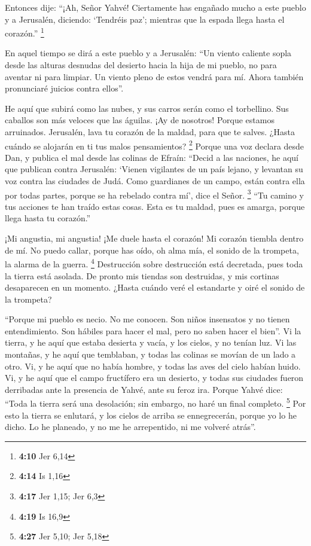 \begin{paracol}{2}
 Entonces dije: ``¡Ah, Señor Yahvé! Ciertamente has
engañado mucho a este pueblo y a Jerusalén, diciendo: `Tendréis paz';
mientras que la espada llega hasta el corazón.'' \footnote{\textbf{4:10}
  Jer 6,14}

 En aquel tiempo se dirá a este pueblo y a Jerusalén:
``Un viento caliente sopla desde las alturas desnudas del desierto hacia
la hija de mi pueblo, no para aventar ni para limpiar. 
Un viento pleno de estos vendrá para mí. Ahora también pronunciaré
juicios contra ellos''.

 He aquí que subirá como las nubes, y sus carros serán
como el torbellino. Sus caballos son más veloces que las águilas. ¡Ay de
nosotros! Porque estamos arruinados.  Jerusalén, lava tu
corazón de la maldad, para que te salves. ¿Hasta cuándo se alojarán en
ti tus malos pensamientos? \footnote{\textbf{4:14} Is 1,16}
 Porque una voz declara desde Dan, y publica el mal desde
las colinas de Efraín:  ``Decid a las naciones, he aquí
que publican contra Jerusalén: `Vienen vigilantes de un país lejano, y
levantan su voz contra las ciudades de Judá.  Como
guardianes de un campo, están contra ella por todas partes, porque se ha
rebelado contra mí', dice el Señor. \footnote{\textbf{4:17} Jer 1,15;
  Jer 6,3}  ``Tu camino y tus acciones te han traído
estas cosas. Esta es tu maldad, pues es amarga, porque llega hasta tu
corazón.''

 ¡Mi angustia, mi angustia! ¡Me duele hasta el corazón!
Mi corazón tiembla dentro de mí. No puedo callar, porque has oído, oh
alma mía, el sonido de la trompeta, la alarma de la guerra. \footnote{\textbf{4:19}
  Is 16,9}  Destrucción sobre destrucción está decretada,
pues toda la tierra está asolada. De pronto mis tiendas son destruidas,
y mis cortinas desaparecen en un momento.  ¿Hasta cuándo
veré el estandarte y oiré el sonido de la trompeta?

 ``Porque mi pueblo es necio. No me conocen. Son niños
insensatos y no tienen entendimiento. Son hábiles para hacer el mal,
pero no saben hacer el bien''.  Vi la tierra, y he aquí
que estaba desierta y vacía, y los cielos, y no tenían luz.
 Vi las montañas, y he aquí que temblaban, y todas las
colinas se movían de un lado a otro.  Vi, y he aquí que
no había hombre, y todas las aves del cielo habían huido.
 Vi, y he aquí que el campo fructífero era un desierto, y
todas sus ciudades fueron derribadas ante la presencia de Yahvé, ante su
feroz ira.  Porque Yahvé dice: ``Toda la tierra será una
desolación; sin embargo, no haré un final completo. \footnote{\textbf{4:27}
  Jer 5,10; Jer 5,18}  Por esto la tierra se enlutará, y
los cielos de arriba se ennegrecerán, porque yo lo he dicho. Lo he
planeado, y no me he arrepentido, ni me volveré atrás''.


\end{paracol}
